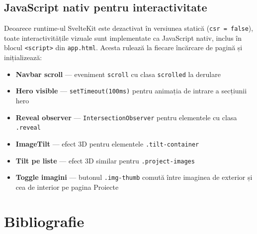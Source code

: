\documentclass[12pt,a4paper]{report}
\begin{document}
\section{JavaScript nativ pentru interactivitate}

Deoarece runtime-ul SvelteKit este dezactivat în versiunea statică
(\texttt{csr = false}), toate interactivitățile vizuale sunt implementate ca
JavaScript nativ, inclus în blocul \texttt{<script>} din \texttt{app.html}.
Acesta rulează la fiecare încărcare de pagină și inițializează:

\begin{itemize}
  \item \textbf{Navbar scroll} --- eveniment \texttt{scroll} cu clasa
        \texttt{scrolled} la derulare
  \item \textbf{Hero visible} --- \texttt{setTimeout(100ms)} pentru animația
        de intrare a secțiunii hero
  \item \textbf{Reveal observer} --- \texttt{IntersectionObserver} pentru
        elementele cu clasa \texttt{.reveal}
  \item \textbf{ImageTilt} --- efect 3D pentru elementele \texttt{.tilt-container}
  \item \textbf{Tilt pe liste} --- efect 3D similar pentru \texttt{.project-images}
  \item \textbf{Toggle imagini} --- butonul \texttt{.img-thumb} comută între
        imaginea de exterior și cea de interior pe pagina Proiecte
\end{itemize}

\chapter{Bibliografie}
\end{document}
